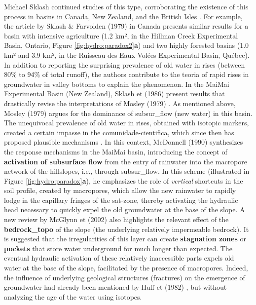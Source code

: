 \documentclass[./main_en.tex]{subfiles}
\begin{document}
\noindent Michael Sklash continued studies of this type, corroborating the existence of this process in basins in Canada, New Zealand, and the British Isles \cite{sklash1979, sklash1986, sklash1996}. For example, the article by Sklash \& Farvolden (1979) \cite{sklash1979} in Canada presents similar results for a basin with intensive agriculture (1.2 km², in the Hillman Creek Experimental Basin, Ontario, Figure \ref{fig:hydro:paradox2}\textbf{a}) and two highly forested basins (1.0 km² and 3.9 km², in the Ruisseau des Eaux Volées Experimental Basin, Québec). In addition to reporting the surprising prevalence of old water in rises (between 80\% to 94\% of total runoff), the authors contribute to the \gls{teoria} of rapid rises in groundwater in valley bottoms to explain the phenomenon. In the MaiMai Experimental Basin (New Zealand), Sklash et  (1986) \cite{sklash1986} present results that drastically revise the interpretations of Mosley (1979) \cite{Mosley1979}. As mentioned above, Mosley (1979) argues for the dominance of \gls{subsur_flow} (new water) in this basin. The unequivocal prevalence of old water in rises, obtained with isotopic markers, created a certain impasse in the \gls{comunidade-cientifica}, which since then has proposed plausible mechanisms \cite{buttle1994}. In this context, McDonnell (1990) \cite{mcdonnell1990} synthesizes the response mechanisms in the MaiMai basin, introducing the concept of \textbf{activation of subsurface flow} from the entry of rainwater into the macropore network of the hillslopes, i.e., through \gls{subsur_flow}. In this scheme (illustrated in Figure \ref{fig:hydro:paradox}\textbf{a}), he emphasizes the role of \textit{vertical} shortcuts in the soil profile, created by macropores, which allow the new rainwater to rapidly lodge in the capillary fringes of the \gls{sat-zone}, thereby activating the hydraulic head necessary to quickly expel the old groundwater at the base of the slope. A new review by McGlynn et  (2002) \cite{mcglynn2002} also highlights the relevant effect of the \textbf{\gls{bedrock_topo}} of the slope (the underlying relatively impermeable bedrock). It is suggested that the irregularities of this layer can create \textbf{stagnation zones} or \textbf{pockets} that store water underground for much longer than expected. The eventual hydraulic activation of these relatively inaccessible parts expels old water at the base of the slope, facilitated by the presence of macropores. Indeed, the influence of underlying geological structures (fractures) on the emergence of groundwater had already been mentioned by Huff et  (1982) \cite{Huff1982}, but without analyzing the age of the water using isotopes.
\end{document}
